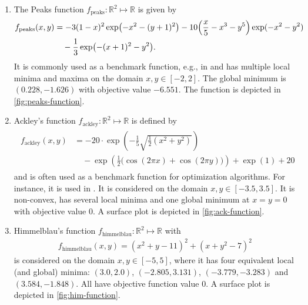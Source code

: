 \begin{enumerate}
    \item The Peaks function $f_{\text{peaks}} \colon \mathbb{R}^2 \mapsto \mathbb{R}$ is given by
    \begin{align}
        \begin{split}
        f_{\text{peaks}}(x,y) &= - 3 (1-x)^2 \exp\bigl(-x^2 - (y+1)^2\bigr)   - 10 \Bigl( \frac{x}{5} - x^3 - y^5\Bigr) \exp(-x^2 - y^2) \\
            & \quad - \frac{1}{3}  \exp\bigl(-(x+1)^2 - y^2\bigr).
        \end{split}
        \label{fun:peaks}
    \end{align}
    It is commonly used as a benchmark function, e.g., in \citet{Schweidtmann2019a} and has multiple local minima and maxima on the domain $x,y \in [-2,2]$. The global minimum is $(0.228, -1.626)$ with objective value $-6.551$. The function is depicted in \vref{fig:peaks-function}.

    \item Ackley's function $f_{\text{ackley}} \colon \mathbb{R}^2 \mapsto \mathbb{R}$ is defined by
    \begin{align}
        \begin{split}
            f_{\text{ackley}}(x,y) & = -20 \cdot \exp \left(-\frac{1}{5}\sqrt{\frac{1}{2}(x^2+y^2)}\right) \\
                            & \quad  - \exp \left(\frac{1}{2} \bigl(\cos(2\pi x) + \cos(2\pi y)\bigr) \right) + \exp(1) + 20    
        \end{split}
        \label{fun:ack}
    \end{align}
    and is often used as a benchmark function for optimization algorithms. For instance, it is used in \citet{Tsay2021}. It is considered on the domain $x,y \in [-3.5,3.5]$. It is non-convex, has several local minima and one global minimum at $x=y=0$ with objective value $0$. A surface plot is depicted in \vref{fig:ack-function}.

    \item Himmelblau's function $f_{\text{himmelblau}} \colon \mathbb{R}^2 \mapsto \mathbb{R}$ with
    \begin{align}\label{fun:him}
        f_{\text{himmelblau}}(x,y) =  (x^2 + y - 11)^2 + (x + y^2 - 7)^2
    \end{align}
    is considered on the domain $x,y \in [-5,5]$, where it has four equivalent local (and global) minima: $(3.0,2.0)$, $(-2.805, 3.131)$, $(-3.779, -3.283)$ and $(3.584,-1.848)$. All have objective function value $0$. A surface plot is depicted in \vref{fig:him-function}.
\end{enumerate}

